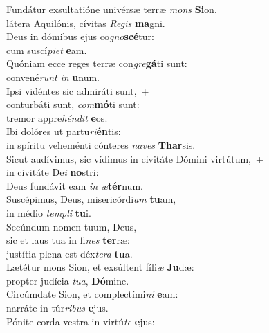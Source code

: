 \evenverse Fundátur exsultatióne univérsæ terræ \textit{mons} \textbf{Si}on,~\*\\
\evenverse látera Aquilónis, cívitas \textit{Re}\textit{gis} \textbf{ma}gni.\\
\oddverse Deus in dómibus ejus co\textit{gno}\textbf{scé}tur:~\*\\
\oddverse cum suscí\textit{pi}\textit{et} \textbf{e}am.\\
\evenverse Quóniam ecce reges terræ con\textit{gre}\textbf{gá}ti sunt:~\*\\
\evenverse convené\textit{runt} \textit{in} \textbf{u}num.\\
\oddverse Ipsi vidéntes sic admiráti sunt,~+\\
\oddverse  conturbáti sunt, \textit{com}\textbf{mó}ti sunt:~\*\\
\oddverse tremor appre\textit{hén}\textit{dit} \textbf{e}os.\\
\evenverse Ibi dolóres ut partu\textit{ri}\textbf{én}tis:~\*\\
\evenverse in spíritu veheménti cónteres \textit{na}\textit{ves} \textbf{Thar}sis.\\
\oddverse Sicut audívimus, sic vídimus in civitáte Dómini virtútum,~+\\
\oddverse  in civitáte De\textit{i} \textbf{no}stri:~\*\\
\oddverse Deus fundávit eam \textit{in} \textit{æ}\textbf{tér}num.\\
\evenverse Suscépimus, Deus, misericórdi\textit{am} \textbf{tu}am,~\*\\
\evenverse in médio \textit{tem}\textit{pli} \textbf{tu}i.\\
\oddverse Secúndum nomen tuum, Deus,~+\\
\oddverse  sic et laus tua in fi\textit{nes} \textbf{ter}ræ:~\*\\
\oddverse justítia plena est déx\textit{te}\textit{ra} \textbf{tu}a.\\
\evenverse Lætétur mons Sion, et exsúltent fíli\textit{æ} \textbf{Ju}dæ:~\*\\
\evenverse propter judícia \textit{tu}\textit{a}, \textbf{Dó}mine.\\
\oddverse Circúmdate Sion, et complectími\textit{ni} \textbf{e}am:~\*\\
\oddverse narráte in túr\textit{ri}\textit{bus} \textbf{e}jus.\\
\evenverse Pónite corda vestra in virtú\textit{te} \textbf{e}jus:~\*\\

